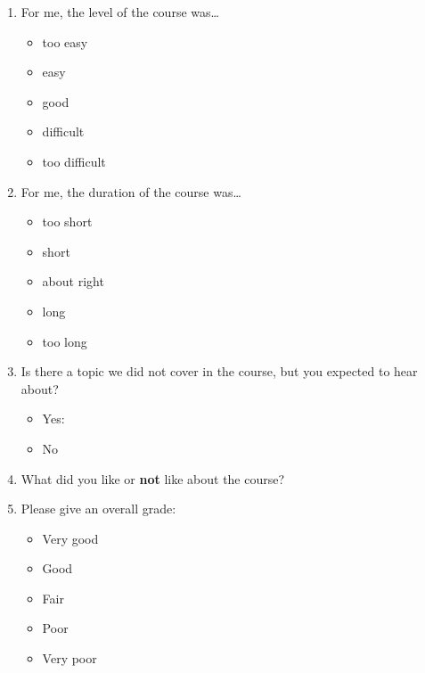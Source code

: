 \documentclass{scrartcl}
\begin{document}
\begin{enumerate}
\begin{multicols}{3}
\begin{itemize}[label={\Square}]
      \item established in your group
      \item ignored by your group
      \item unkown to you / your group
    \end{itemize}
  \end{multicols}
\item For me, the level of the course was\ldots
  \begin{multicols}{5}
    \begin{itemize}[label={\Square}]
    \item too easy
    \item easy
    \item good
    \item difficult
    \item too difficult
    \end{itemize}
  \end{multicols}
\pagebreak
\item For me, the duration of the course was\ldots
  \begin{multicols}{5}
    \begin{itemize}[label={\Square}]
    \item too short
    \item short
    \item about right
    \item long
    \item too long
    \end{itemize}
  \end{multicols}
\item Is there a topic we did not cover in the course, but you expected to hear about?
    \begin{itemize}[label={\Square}]
    \item Yes: 
    \item No
    \end{itemize}
  \item What did you like or \textbf{not} like about the course?
    \vspace{1.7cm}
  \item Please give an overall grade:
    \begin{multicols}{5}
    \begin{itemize}[label={\Square}]
    \item Very good
    \item Good
    \item Fair
    \item Poor
    \item Very poor
    \end{itemize}
  \end{multicols}
\end{enumerate}
\end{document}
